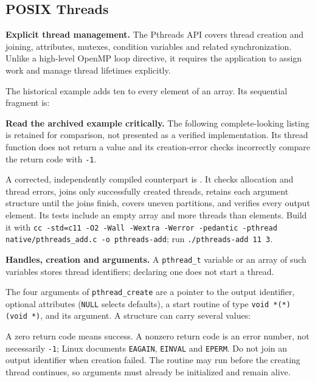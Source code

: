 { %
\subsection{POSIX Threads}
\label{PThreads:section}
\par\textbf{Explicit thread management.} The Pthreads API covers thread creation and joining, attributes, mutexes, condition variables and related synchronization. Unlike a high-level OpenMP loop directive, it requires the application to assign work and manage thread lifetimes explicitly.

\par The historical example adds ten to every element of an array. Its sequential fragment is:

\par\textbf{Read the archived example critically.} The following complete-looking listing is retained for comparison, not presented as a verified implementation. Its thread function does not return a value and its creation-error checks incorrectly compare the return code with \texttt{-1}.

\par A corrected, independently compiled counterpart is . It checks allocation and thread errors, joins only successfully created threads, retains each argument structure until the joins finish, covers uneven partitions, and verifies every output element. Its tests include an empty array and more threads than elements. Build it with \texttt{cc -std=c11 -O2 -Wall -Wextra -Werror -pedantic -pthread native/pthreads\_add.c -o pthreads-add}; run \texttt{./pthreads-add 11 3}.
\par\textbf{Handles, creation and arguments.} A \texttt{pthread\_t} variable or an array of such variables stores thread identifiers; declaring one does not start a thread.


\par The four arguments of \texttt{pthread\_create} are a pointer to the output identifier, optional attributes (\texttt{NULL} selects defaults), a start routine of type \texttt{void *(*)(void *)}, and its argument. A structure can carry several values:

\par A zero return code means success. A nonzero return code is an error number, not necessarily \texttt{-1}; Linux documents \texttt{EAGAIN}, \texttt{EINVAL} and \texttt{EPERM}. Do not join an output identifier when creation failed. The routine may run before the creating thread continues, so arguments must already be initialized and remain alive.
}
